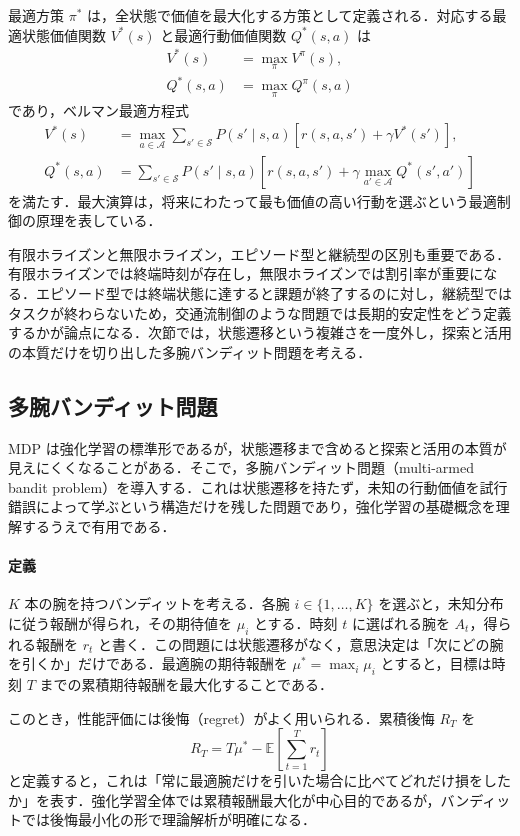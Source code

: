 最適方策 $\pi^\ast$ は，全状態で価値を最大化する方策として定義される．対応する最適状態価値関数 $V^\ast(s)$ と最適行動価値関数 $Q^\ast(s,a)$ は
\begin{align*}
V^\ast(s) &= \max_\pi V^\pi(s), \\
Q^\ast(s,a) &= \max_\pi Q^\pi(s,a)
\end{align*}
であり，ベルマン最適方程式
\begin{align*}
V^\ast(s)
&=
\max_{a \in \mathcal{A}}
\sum_{s' \in \mathcal{S}} P(s' \mid s,a)
\left[
r(s,a,s') + \gamma V^\ast(s')
\right], \\
Q^\ast(s,a)
&=
\sum_{s' \in \mathcal{S}} P(s' \mid s,a)
\left[
r(s,a,s') + \gamma \max_{a' \in \mathcal{A}} Q^\ast(s',a')
\right]
\end{align*}
を満たす．最大演算は，将来にわたって最も価値の高い行動を選ぶという最適制御の原理を表している．

有限ホライズンと無限ホライズン，エピソード型と継続型の区別も重要である．有限ホライズンでは終端時刻が存在し，無限ホライズンでは割引率が重要になる．エピソード型では終端状態に達すると課題が終了するのに対し，継続型ではタスクが終わらないため，交通流制御のような問題では長期的安定性をどう定義するかが論点になる．次節では，状態遷移という複雑さを一度外し，探索と活用の本質だけを切り出した多腕バンディット問題を考える．

\subsection{多腕バンディット問題}

MDP は強化学習の標準形であるが，状態遷移まで含めると探索と活用の本質が見えにくくなることがある．そこで，多腕バンディット問題（multi-armed bandit problem）を導入する．これは状態遷移を持たず，未知の行動価値を試行錯誤によって学ぶという構造だけを残した問題であり，強化学習の基礎概念を理解するうえで有用である\cite{Auer2002,LattimoreSzepesvari2020}．

\paragraph*{定義}
$K$ 本の腕を持つバンディットを考える．各腕 $i \in \{1,\ldots,K\}$ を選ぶと，未知分布に従う報酬が得られ，その期待値を $\mu_i$ とする．時刻 $t$ に選ばれる腕を $A_t$，得られる報酬を $r_t$ と書く．この問題には状態遷移がなく，意思決定は「次にどの腕を引くか」だけである．最適腕の期待報酬を $\mu^\ast=\max_i \mu_i$ とすると，目標は時刻 $T$ までの累積期待報酬を最大化することである．

このとき，性能評価には後悔（regret）がよく用いられる．累積後悔 $R_T$ を
\begin{equation*}
R_T
=
T \mu^\ast - \mathbb{E}\left[\sum_{t=1}^{T} r_t\right]
\end{equation*}
と定義すると，これは「常に最適腕だけを引いた場合に比べてどれだけ損をしたか」を表す．強化学習全体では累積報酬最大化が中心目的であるが，バンディットでは後悔最小化の形で理論解析が明確になる．

